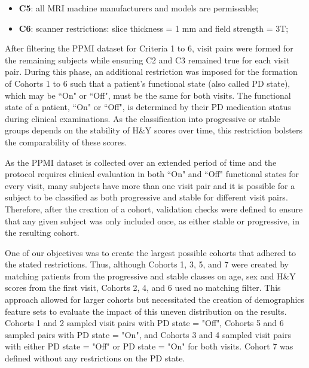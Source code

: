 \begin{itemize}
  \item \textbf{C5}: all MRI machine manufacturers and models are permissable;
  \item \textbf{C6}: scanner restrictions: slice thickness = 1 mm and field strength = 3T;
\end{itemize}

After filtering the PPMI dataset for Criteria 1 to 6, visit pairs were formed for the remaining subjects while ensuring C2 and C3 remained true for each visit pair. 
During this phase, an additional restriction was imposed for the formation of Cohorts 1 to 6 such that a patient's functional state (also called PD state), which 
may be ``On" or ``Off", must be the same for both visits. The functional state of a patient, ``On" or ``Off", is determined by their PD medication status during clinical 
examinations. As the classification into progressive or stable groups depends on the stability of H\&Y scores over time, this restriction bolsters the comparability of 
these scores.

As the PPMI dataset is collected over an extended period of time and the protocol requires clinical evaluation in both ``On" and ``Off" functional states for every visit, many 
subjects have more than one visit pair and it is possible for a subject to be classified as both progressive and stable for different visit pairs. Therefore, after the 
creation of a cohort, validation checks were defined to ensure that any given subject was only included once, as either stable or progressive, in the resulting cohort. 

One of our objectives was to create the largest possible cohorts that adhered to the stated restrictions. Thus, although Cohorts 1, 3, 5, and 7 were created 
by matching patients from the progressive and stable classes on age, sex and H\&Y scores from the first visit, Cohorts 2, 4, and 6 used no matching filter.
This approach allowed for larger cohorts but necessitated the creation of demographics feature sets to evaluate the impact of this uneven distribution on the results. 
Cohorts 1 and 2 sampled visit pairs with PD state = "Off", Cohorts 5 and 6 sampled pairs with PD state = "On", and Cohorts 3 and 4 sampled visit pairs with 
either PD state = "Off" or PD state = "On" for both visits. Cohort 7 was defined without any restrictions on the PD state.

